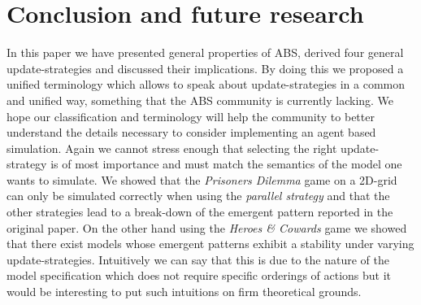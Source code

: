 \section{Conclusion and future research}
In this paper we have presented general properties of ABS, derived four general update-strategies and discussed their implications. By doing this we proposed a unified terminology which allows to speak about update-strategies in a common and unified way, something that the ABS community is currently lacking. We hope our classification and terminology will help the community to better understand the details necessary to consider implementing an agent based simulation. Again we cannot stress enough that selecting the right update-strategy is of most importance and must match the semantics of the model one wants to simulate.
We showed that the \textit{Prisoners Dilemma} game on a 2D-grid can only be simulated correctly when using the \textit{parallel strategy} and that the other strategies lead to a break-down of the emergent pattern reported in the original paper. On the other hand using the \textit{Heroes \& Cowards} game we showed that there exist models whose emergent patterns exhibit a stability under varying update-strategies. Intuitively we can say that this is due to the nature of the model specification which does not require specific orderings of actions but it would be interesting to put such intuitions on firm theoretical grounds.